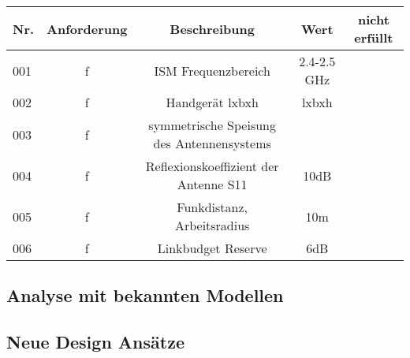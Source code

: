 \begin{tabular}{l|c|c|c|c}
\hline 
Nr. & Anforderung & Beschreibung & Wert & nicht erfüllt \\ 
\hline 
\hline 
001 & f & ISM Frequenzbereich  & 2.4-2.5 GHz & \\ 
\hline 
002 & f & Handgerät lxbxh & lxbxh &   \\ 
\hline 
003 & f & symmetrische Speisung des Antennensystems &  \\ 
\hline 
004 & f & Reflexionskoeffizient der Antenne S11 & 10dB & \\ 
\hline 
005 & f & Funkdistanz, Arbeitsradius & 10m &  \\ 
\hline 
006 & f & Linkbudget Reserve & 6dB &  \\ 
\end{tabular} 

\subsection{Analyse mit bekannten Modellen}
\subsection{Neue Design Ansätze}